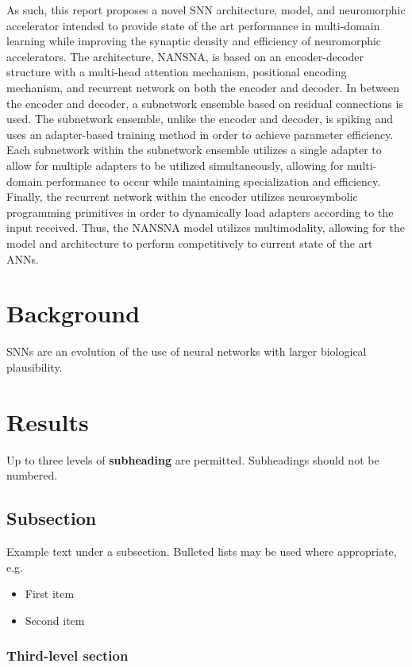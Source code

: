 \documentclass[fleqn,10pt]{wlscirep}
\begin{document}
As such, this report proposes a novel SNN architecture, model, and neuromorphic accelerator intended to provide state of the art performance in multi-domain learning while improving the synaptic density and efficiency of neuromorphic accelerators. The architecture, NANSNA, is based on an encoder-decoder structure with a multi-head attention mechanism, positional encoding mechanism, and recurrent network on both the encoder and decoder. In between the encoder and decoder, a subnetwork ensemble based on residual connections is used. The subnetwork ensemble, unlike the encoder and decoder, is spiking and uses an adapter-based training method in order to achieve parameter efficiency. Each subnetwork within the subnetwork ensemble utilizes a single adapter to allow for multiple adapters to be utilized simultaneously, allowing for multi-domain performance to occur while maintaining specialization and efficiency. Finally, the recurrent network within the encoder utilizes neurosymbolic programming primitives in order to dynamically load adapters according to the input received. Thus, the NANSNA model utilizes multimodality, allowing for the model and architecture to perform competitively to current state of the art ANNs.

\section*{Background}

SNNs are an evolution of the use of neural networks with larger biological plausibility. 

\section*{Results}

Up to three levels of \textbf{subheading} are permitted. Subheadings should not be numbered.

\subsection*{Subsection}

Example text under a subsection. Bulleted lists may be used where appropriate, e.g.

\begin{itemize}
\item First item
\item Second item
\end{itemize}

\subsubsection*{Third-level section}
 
\end{document}
